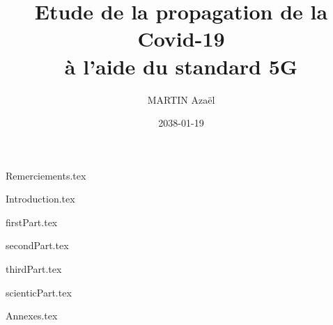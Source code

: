 \documentclass{rUTT}
\date{2038-01-19}
\author{{\sc MARTIN} Azaël
}
\title{Etude de la propagation de la Covid-19 \\ à l'aide du standard 5G}
\begin{document}

    \frontpageSTB %

    {
        \myILB
    }


    \pagestyle{UTT} %
    \justifying %


    {Remerciements.tex} %

    \clearpage


    \clearpage


    {Introduction.tex}

    \clearpage

    {firstPart.tex}

    \clearpage

    {secondPart.tex}

    \clearpage

    {thirdPart.tex}

    \clearpage

    {scienticPart.tex}

    \clearpage


    {Annexes.tex}

    \clearpage


    {
    \raggedright %
    \sloppy
    \nocite{*} %
    \printbibliography[title={Bibliographie},heading=bibintoc]

    \clearpage
    \listoffigures
    \listoftables
    }
    \clearpage
    \thispagestyle{empty}
    \setcounter{tocdepth}{10} %
    \tableofcontents

    \clearpage
    \myemptypage
\end{document}
